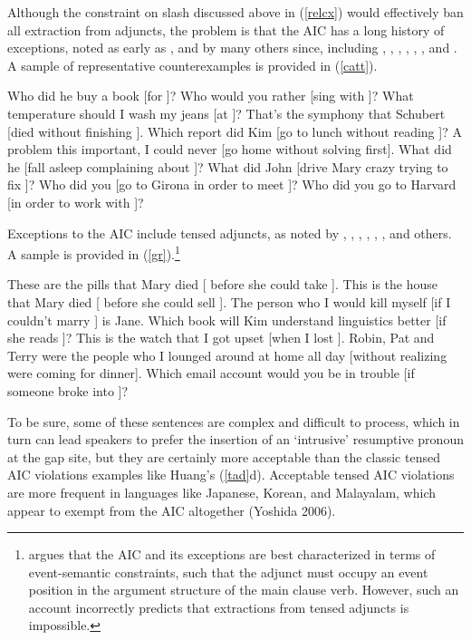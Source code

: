\documentclass[output=paper]{langsci/langscibook}
\begin{document}
Although the constraint on {\sc slash} discussed above in (\ref{relcx}) would effectively ban 
all extraction from adjuncts,  the problem is that the AIC has a long history of exceptions, 
noted as early as \citet[38]{cattell}, and by many others since, including 
\citet[72]{chomsky82}, \citet{engdahl}, \citet[103]{hegarty90}, \citet{cinque}, \citet[??]{pollardsag}, 
\citet[253]{culicover87}, and \citet{borg}. A sample of representative counterexamples
is provided in (\ref{catt}). 



\ea
\ea Who did he buy a book [for \spc]?
\ex Who would you rather [sing  with \spc]?
\ex What temperature should I wash my jeans [at \spc]?
\ex That's the symphony that Schubert [died without finishing \spc].
\ex Which report did Kim [go to lunch without reading \spc]?
\ex A problem this important, I could never [go home without solving \spcs first].
\ex  What did he [fall asleep  complaining about \spc]?
\ex  What did John [drive Mary crazy trying to fix \spc]?
\ex Who did you [go to Girona in order to meet \spc]?
\ex Who did you go to Harvard [in order to work with \spc]?
\z \label{catt}
\z

 Exceptions to the AIC include  tensed adjuncts, 
as noted by \citet[88]{grosu81}, \citet[29]{deane}, \citet{kluender}, \citep[287]{levhubook},  \citet[144]{gold06},  \citet[471]{chavesextr}, \citet[175, ft.1]{truswellbook} and others. A sample is provided in (\ref{gr}).\footnote{\citet{truswellbook} argues that the AIC and its exceptions are best characterized in terms of event-semantic constraints, such that the adjunct must occupy an event position in the argument structure of the main clause verb. However, such an account incorrectly predicts that extractions from tensed adjuncts is impossible.}

\ea \label{gr}
  \ea These are the pills that Mary died [ before she could take \spc].
   \ex This is the house that Mary died [ before she could sell \spc].
\ex  The person who I would kill myself [if I couldn't marry \spc] is Jane.
\ex Which book  will Kim understand linguistics better [if she reads \spc]?
\ex  This is the watch that I got upset [when I lost \spc].
\ex   Robin, Pat and Terry were the people who I lounged around at home
all day [without realizing were \spcs coming for dinner].
\ex Which email account would you be in trouble [if someone broke into \spc]?
\z 
\z

\noindent 
To be sure, some of these  sentences are complex and difficult to process,  
which in turn can lead speakers to prefer the insertion of an `intrusive' resumptive 
pronoun at the gap site, but they are certainly more acceptable than the 
classic tensed AIC violations examples like Huang's (\ref{tad}d).
Acceptable tensed AIC violations are more frequent in languages like Japanese, Korean,  and Malayalam, which appear to exempt from the AIC altogether (Yoshida 2006). 
\end{document}
